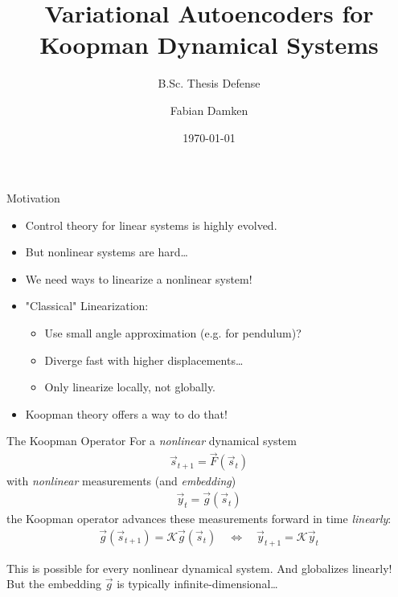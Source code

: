 \documentclass[
	aspectratio=43,
	color={accentcolor=1c},
	logo=false,
	colorframetitle=true
]{tudabeamer}
\title{Variational Autoencoders for Koopman Dynamical Systems}
\subtitle{B.Sc. Thesis Defense}
\author{Fabian Damken}
\institute{Intelligent Autonomous Systems}
\date{\today}
\begin{document}
	\maketitle

	\begin{frame}{Motivation}
		\begin{itemize}
			\item Control theory for linear systems is highly evolved.
			\item But nonlinear systems are hard\dots
			\item We need ways to linearize a nonlinear system!
			\item<2-> "Classical" Linearization:
				\begin{itemize}
					\item Use small angle approximation (e.g. for pendulum)?
					\item Diverge fast with higher displacements\dots
					\item Only linearize locally, not globally.
				\end{itemize}
			\item<3-> Koopman theory offers a way to do that!
		\end{itemize}
	\end{frame}

	\begin{frame}{The Koopman Operator}
		For a \emph{nonlinear} dynamical system
		\begin{align*}
			\vec{s}_{t + 1} = \vec{F}(\vec{s}_{t})
		\end{align*}
		with \emph{nonlinear} measurements (and \emph{embedding})
		\begin{align*}
			\vec{y}_t = \vec{g}(\vec{s}_t)
		\end{align*}
		the Koopman operator advances these measurements forward in time \emph{linearly}:
		\begin{align*}
			\vec{g}(\vec{s}_{t + 1}) = \mathcal{K} \vec{g}(\vec{s}_t)
			\quad\iff\quad
			\vec{y}_{t + 1} = \mathcal{K} \vec{y}_t
		\end{align*}

		This is possible for every nonlinear dynamical system. And globalizes linearly! But the embedding \(\vec{g}\) is typically infinite-dimensional\dots
	\end{frame}
\end{document}
